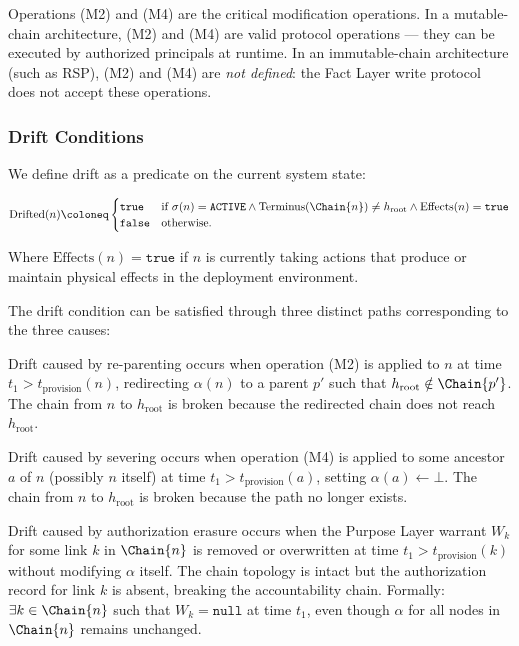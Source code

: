 Operations (M2) and (M4) are the critical modification operations. In a mutable-chain architecture, (M2) and (M4) are valid protocol operations — they can be executed by authorized principals at runtime. In an immutable-chain architecture (such as RSP), (M2) and (M4) are \emph{not defined}: the Fact Layer write protocol does not accept these operations.

\subsubsection{Drift Conditions}

We define drift as a predicate on the current system state:

\[
\text{Drifted}(n) \coloneq
\begin{cases}
\texttt{true} & \text{if } \sigma(n) = \texttt{ACTIVE} \land \text{Terminus}(\Chain{n}) \neq h_{\text{root}} \land \text{Effects}(n) = \texttt{true} \\
\texttt{false} & \text{otherwise.}
\end{cases}
\]

Where $\text{Effects}(n) = \texttt{true}$ if $n$ is currently taking actions that produce or maintain physical effects in the deployment environment.

The drift condition can be satisfied through three distinct paths corresponding to the three causes:

\begin{dfn}
\label{dfn:reparenting-drift}
Drift caused by re-parenting occurs when operation (M2) is applied to $n$ at time $t_1 > t_{\text{provision}}(n)$, redirecting $\alpha(n)$ to a parent $p'$ such that $h_{\text{root}} \notin \Chain{p'}$. The chain from $n$ to $h_{\text{root}}$ is broken because the redirected chain does not reach $h_{\text{root}}$.
\end{dfn}

\begin{dfn}
\label{dfn:severing-drift}
Drift caused by severing occurs when operation (M4) is applied to some ancestor $a$ of $n$ (possibly $n$ itself) at time $t_1 > t_{\text{provision}}(a)$, setting $\alpha(a) \leftarrow \bot$. The chain from $n$ to $h_{\text{root}}$ is broken because the path no longer exists.
\end{dfn}

\begin{dfn}
\label{dfn:auth-erasure-drift}
Drift caused by authorization erasure occurs when the Purpose Layer warrant $W_k$ for some link $k$ in $\Chain{n}$ is removed or overwritten at time $t_1 > t_{\text{provision}}(k)$ without modifying $\alpha$ itself. The chain topology is intact but the authorization record for link $k$ is absent, breaking the accountability chain. Formally: $\exists k \in \Chain{n}$ such that $W_k = \texttt{null}$ at time $t_1$, even though $\alpha$ for all nodes in $\Chain{n}$ remains unchanged.
\end{dfn}

